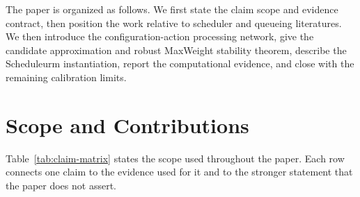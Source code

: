 \documentclass[opre,dblanonrev]{informs4}
\begin{document}
The paper is organized as follows.  We first state the claim scope and evidence
contract, then position the work relative to scheduler and queueing literatures.
We then introduce the configuration-action processing network, give the
candidate approximation and robust MaxWeight stability theorem, describe the
Scheduleurm instantiation, report the computational evidence, and close with
the remaining calibration limits.

\section{Scope and Contributions}
\label{sec:scope}

Table~\ref{tab:claim-matrix} states the scope used throughout the paper.  Each
row connects one claim to the evidence used for it and to the stronger statement
that the paper does not assert.
\end{document}
